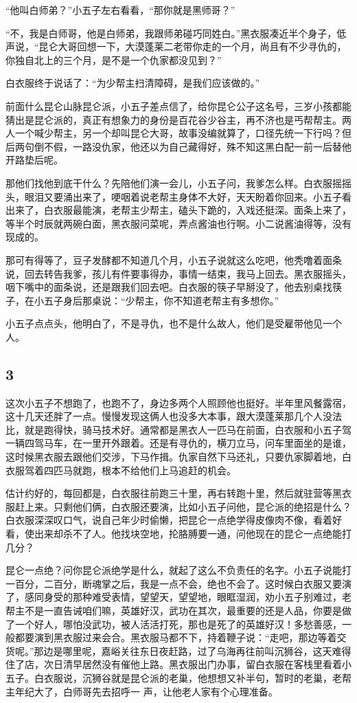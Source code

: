 “他叫白师弟？”小五子左右看看，“那你就是黑师哥？”

“不，我是白师哥，他是白师弟，我跟师弟碰巧同姓白。”黑衣服凑近半个身子，低声说，“昆仑大哥回想一下，大漠蓬莱二老带你走的一个月，尚且有不少寻仇的，你独自北上的三个月，是不是一个仇家都没见到？”

白衣服终于说话了：“为少帮主扫清障碍，是我们应该做的。”

前面什么昆仑山脉昆仑派，小五子差点信了，给你昆仑公子这名号，三岁小孩都能猜出是昆仑派的，真正有想象力的身份是百花谷少谷主，再不济也是丐帮帮主。两人一个喊少帮主，另一个却叫昆仑大哥，故事没编就算了，口径先统一下行吗？但后两句倒不假，一路没仇家，他还以为自己藏得好，殊不知这黑白配一前一后替他开路垫后呢。

那他们找他到底干什么？先陪他们演一会儿，小五子问，我爹怎么样。白衣服摇摇头，眼泪又要涌出来了，哽咽着说老帮主身体不大好，天天盼着你回来。小五子看出来了，白衣服最能演，老帮主少帮主，磕头下跪的，入戏还挺深。面条上来了，等半个时辰就两碗白面，黑衣服问菜呢，弄点酱油也行啊。小二说酱油得等，没有现成的。

那可有得等了，豆子发酵都不知道几个月，小五子说就这么吃吧，他秃噜着面条说，回去转告我爹，孩儿有件要事得办，事情一结束，我马上回去。黑衣服摇头，咽下嘴中的面条说，还是跟我们回去吧。白衣服的筷子早掰没了，他去别桌找筷子，在小五子身后那桌说：“少帮主，你不知道老帮主有多想你。”

小五子点点头，他明白了，不是寻仇，也不是什么故人，他们是受雇带他见一个人。
\newline

{\centering\subsection{3}}

这次小五子不想跑了，也跑不了，身边多两个人照顾他也挺好。半年里风餐露宿，这十几天还胖了一点。慢慢发现这俩人也没多大本事，跟大漠蓬莱那几个人没法比，就是跑得快，骑马技术好。通常都是黑衣人一匹马在前面，白衣服和小五子驾一辆四驾马车，在一里开外跟着。还是有寻仇的，横刀立马，问车里面坐的是谁，这时候黑衣服去跟他们交涉，下马作揖。仇家自然下马还礼，只要仇家脚着地，白衣服驾着四匹马就跑，根本不给他们上马追赶的机会。

估计约好的，每回都是，白衣服往前跑三十里，再右转跑十里，然后就驻营等黑衣服赶上来。只剩他们俩，白衣服还要演，比如小五子问他，昆仑派的绝招是什么？白衣服深深叹口气，说自己年少时偷懒，把昆仑一点绝学得皮像肉不像，看着好看，使出来却杀不了人。他找块空地，抡胳膊要一通，问他现在的昆仑一点绝能打几分？

昆仑一点绝？问你昆仑派绝学是什么，就起了这么不负责任的名字。小五子说能打一百分，二百分，断魂掌之后，我是一点不会，绝也不会了。这时候白衣服又要演了，感同身受的那种难受表情，望望天，望望地，眼眶湿润，劝小五子别难过，老帮主不是一直告诫咱们嘛，英雄好汉，武功在其次，最重要的还是人品，你要是做了一个好人，哪怕没武功，被人活活打死，那也是死了的英雄好汉！多愁善感，一般都要演到黑衣服过来会合。黑衣服马都不下，持着鞭子说：“走吧，那边等着交货呢。”那边是哪里呢，嘉峪关往东日夜赶路，过了乌海再往前叫沉狮谷，这天难得住了店，次日清早居然没有催他上路。黑衣服出门办事，留白衣服在客栈里看着小五子。白衣服说，沉狮谷就是昆仑派的老巢，他想想又补半句，暂时的老巢，老帮主年纪大了，白师哥先去招呼一
声，让他老人家有个心理准备。

